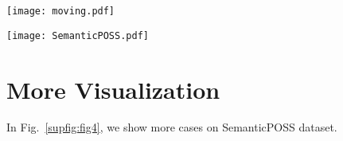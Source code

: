\documentclass[letterpaper]{article} \usepackage{aaai21}  \usepackage{times}  \usepackage{helvet} \usepackage{courier}  \usepackage[hyphens]{url}  \usepackage{graphicx} \urlstyle{rm} \def\UrlFont{\rm}  \usepackage{natbib}  \usepackage{booktabs}
\begin{document}
	
		\begin{figure*}[t]
        \centering
        \texttt{[image: moving.pdf]}
        \caption{The selected example of ground truths for SSC, where (left) and (right) illustrate reconstructed results with and without moving objects.} 
        \label{fig:moving}
    \end{figure*}
    
    
	  \begin{figure*}[ht]
		
		\noindent\texttt{[image: SemanticPOSS.pdf]}
		
		\caption{{The visualization results on \textit{SemanticPOSS} dataset.}}
		\label{supfig:fig4}

	\end{figure*}
	


    










    \section{More Visualization}

    In Fig.~\ref{supfig:fig4}, we show more cases on SemanticPOSS dataset.    
\end{document}
